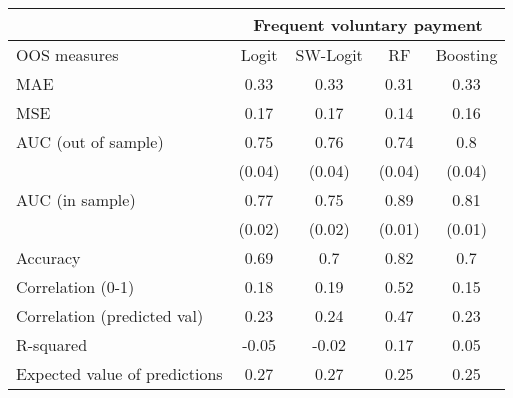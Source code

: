 \begin{tabular}{lcccc}
\toprule
      & \multicolumn{4}{c}{Frequent voluntary payment } \\
\midrule
\midrule
OOS measures & Logit & SW-Logit & RF    & Boosting \\
\midrule
\midrule
MAE   & 0.33  & 0.33  & 0.31  & 0.33 \\
MSE   & 0.17  & 0.17  & 0.14  & 0.16 \\
AUC (out of sample) & 0.75  & 0.76  & 0.74  & 0.8 \\
      & (0.04) & (0.04) & (0.04) & (0.04) \\
AUC (in sample) & 0.77  & 0.75  & 0.89  & 0.81 \\
      & (0.02) & (0.02) & (0.01) & (0.01) \\
Accuracy & 0.69  & 0.7   & 0.82  & 0.7 \\
Correlation (0-1) & 0.18  & 0.19  & 0.52  & 0.15 \\
Correlation (predicted val) & 0.23  & 0.24  & 0.47  & 0.23 \\
R-squared  & -0.05 & -0.02 & 0.17  & 0.05 \\
Expected value of predictions & 0.27  & 0.27  & 0.25  & 0.25 \\
\bottomrule
\bottomrule
\end{tabular}%
